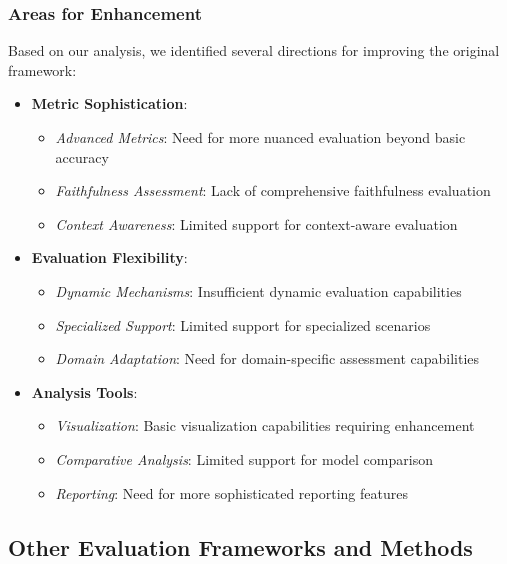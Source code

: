\vspace{0.5em}
\subsubsection{Areas for Enhancement}
Based on our analysis, we identified several directions for improving the original framework:
\begin{itemize}
    \item \textbf{Metric Sophistication}:
    \begin{itemize}
        \item \textit{Advanced Metrics}: Need for more nuanced evaluation beyond basic accuracy
        \item \textit{Faithfulness Assessment}: Lack of comprehensive faithfulness evaluation
        \item \textit{Context Awareness}: Limited support for context-aware evaluation
    \end{itemize}
    
    \item \textbf{Evaluation Flexibility}:
    \begin{itemize}
        \item \textit{Dynamic Mechanisms}: Insufficient dynamic evaluation capabilities
        \item \textit{Specialized Support}: Limited support for specialized scenarios
        \item \textit{Domain Adaptation}: Need for domain-specific assessment capabilities
    \end{itemize}
    
    \item \textbf{Analysis Tools}:
    \begin{itemize}
        \item \textit{Visualization}: Basic visualization capabilities requiring enhancement
        \item \textit{Comparative Analysis}: Limited support for model comparison
        \item \textit{Reporting}: Need for more sophisticated reporting features
    \end{itemize}
\end{itemize}

\subsection{Other Evaluation Frameworks and Methods}

\vspace{0.5em}

